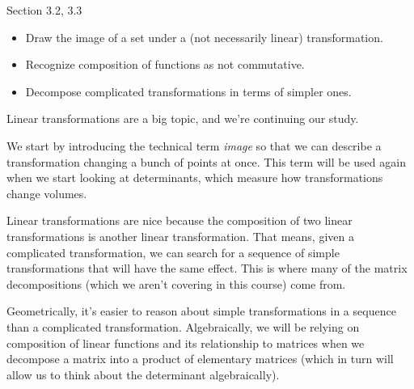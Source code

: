 \documentclass{problemset}
\newcommand{\bookonlynewpage}{\begin{bookonly}\newpage\end{bookonly}}
\begin{document}
\begin{lesson}

	Section 3.2, 3.3

	\begin{itemize}
		\item Draw the image of a set under a (not necessarily linear) transformation.
		\item Recognize composition of functions as not commutative.
		\item Decompose complicated transformations in terms of simpler ones.
	\end{itemize}

		Linear transformations are a big topic, and we're continuing our study.

		We start by introducing the technical term \emph{image} so that we can describe
		a transformation changing a bunch of points at once. This term will be used again when
		we start looking at determinants, which measure how transformations change volumes.

		Linear transformations are nice because the composition of two linear transformations
		is another linear transformation. That means, given a complicated transformation, we can
		search for a sequence of simple transformations that will have the same effect. This is
		where many of the matrix decompositions (which we aren't covering in this course) come from.

		Geometrically, it's easier to reason about simple transformations in a sequence than a complicated
		transformation. Algebraically, we will be relying on composition of linear functions and its relationship
		to matrices when we decompose a matrix into a product of elementary matrices (which in turn will
		allow us to think about the determinant algebraically).
\end{lesson}
	\bookonlynewpage
\end{document}
